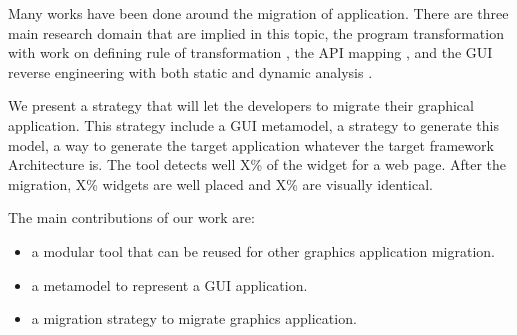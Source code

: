 \documentclass[conference]{IEEEtran}
\begin{document}

    Many works have been done around the migration of application.
    There are three main research domain that are implied in this topic, 
        the program transformation with work on defining rule of transformation \citep{rolim2017learning, brant2010extreme, newman2017simplifying}, 
        the API mapping \citep{nguyen2014statistical, zhong2010mining, teyton2013automatic},
        and the GUI reverse engineering with both static and dynamic analysis \citep{samir2007swing2script, shah2011reverse, joorabchi2012reverse}.
    
    
    We present a strategy that will let the developers to migrate their graphical application.
    This strategy include a GUI metamodel,
        a strategy to generate this model,
        a way to generate the target application whatever the target framework Architecture is.
    The tool detects well X\% of the widget for a web page.
    After the migration, X\% widgets are well placed and X\% are visually identical.
    
    
    The main contributions of our work are:
    \begin{itemize}
    
        \item a modular tool that can be reused for other graphics application migration.
    
        \item a metamodel to represent a GUI application.
    
        \item a migration strategy to migrate graphics application.
        
    \end{itemize}
    
\end{document}
